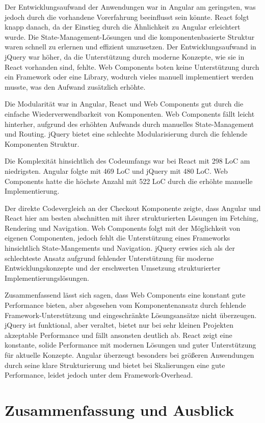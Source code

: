 \documentclass[oneside]{ausarbeitung}
\begin{document}
Der Entwicklungsaufwand der Anwendungen war in Angular am geringsten, was jedoch durch die vorhandene Vorerfahrung beeinflusst sein könnte. React folgt knapp danach, da der Einstieg durch die Ähnlichkeit zu Angular erleichtert wurde. Die State-Management-Lösungen und die komponentenbasierte Struktur waren schnell zu erlernen und effizient umzusetzen. Der Entwicklungsaufwand in jQuery war höher, da die Unterstützung durch moderne Konzepte, wie sie in React vorhanden sind, fehlte. Web Components boten keine Unterstützung durch ein Framework oder eine Library, wodurch vieles manuell implementiert werden musste, was den Aufwand zusätzlich erhöhte.

Die Modularität war in Angular, React und Web Components gut durch die einfache Wiederverwendbarkeit von Komponenten. Web Components fällt leicht hinterher, aufgrund des erhöhten Aufwands durch manuelles State-Management und Routing. jQuery bietet eine schlechte Modularisierung durch die fehlende Komponenten Struktur.

Die Komplexität hinsichtlich des Codeumfangs war bei React mit 298 LoC am niedrigsten. Angular folgte mit 469 LoC und jQuery mit 480 LoC. Web Components hatte die höchste Anzahl mit 522 LoC durch die erhöhte manuelle Implementierung. 

Der direkte Codevergleich an der Checkout Komponente zeigte, dass Angular und React hier am besten abschnitten mit ihrer strukturierten Lösungen im Fetching, Rendering und Navigation. Web Components folgt mit der Möglichkeit von eigenen Componenten, jedoch fehlt die Unterstützung eines Frameworks hinsichtlich State-Mangements und Navigation. jQuery erwies sich als der schlechteste Ansatz aufgrund fehlender Unterstützung für moderne Entwicklungskonzepte und der erschwerten Umsetzung strukturierter Implementierungslösungen.

Zusammenfassend lässt sich sagen, dass Web Components eine konstant gute Performance bieten, aber abgesehen vom Komponentenansatz durch fehlende Framework-Unterstützung und eingeschränkte Lösungsansätze nicht überzeugen. jQuery ist funktional, aber veraltet, bietet nur bei sehr kleinen Projekten akzeptable Performance und fällt ansonsten deutlich ab. React zeigt eine konstante, solide Performance mit modernen Lösungen und guter Unterstützung für aktuelle Konzepte. Angular überzeugt besonders bei größeren Anwendungen durch seine klare Strukturierung und bietet bei Skalierungen eine gute Performance, leidet jedoch unter dem Framework-Overhead.

\chapter{Zusammenfassung und Ausblick}
\label{cha:zusammenfassung}
\end{document}
